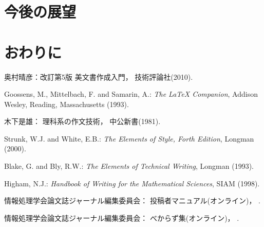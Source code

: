 \documentclass[submit,techrep]{ipsj}
\begin{document}
%

\section{今後の展望}

\section{おわりに}

\begin{thebibliography}{9}
奥村晴彦：改訂第5版 \LaTeXe 美文書作成入門，
技術評論社(2010).

Goossens, M., Mittelbach, F. and Samarin, A.: {\it The LaTeX Companion},
Addison Wesley, Reading, Massachusetts (1993).

木下是雄：
理科系の作文技術，
中公新書(1981).

Strunk, W.J. and White, E.B.: {\it The Elements of Style, Forth Edition},
Longman (2000).

Blake, G. and Bly, R.W.: {\it The Elements of Technical Writing},
Longman (1993).

Higham, N.J.:
{\it Handbook of Writing for the Mathematical Sciences},
SIAM (1998).

情報処理学会論文誌ジャーナル編集委員会：
投稿者マニュアル(オンライン)，
%
.

情報処理学会論文誌ジャーナル編集委員会：
べからず集(オンライン)，
%
.

\end{thebibliography}

\begin{biography}
%
%
\end{biography}
\end{document}
